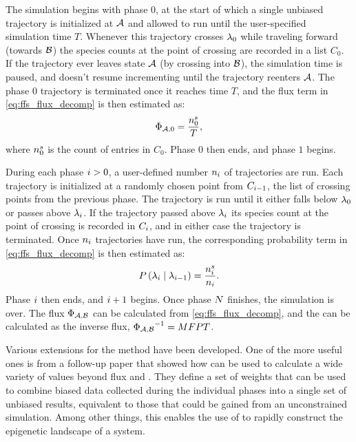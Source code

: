 The simulation begins with phase $0$, at the start of which a single unbiased trajectory is initialized at $\mathcal{A}$ and allowed to run until the user-specified simulation time $T$. Whenever this trajectory crosses ${\lambda}_{0}$ while traveling forward (\ie towards $\mathcal{B}$) the species counts at the point of crossing are recorded in a list $C_0$. If the trajectory ever leaves state $\mathcal{A}$ (\eg by crossing into $\mathcal{B}$), the simulation time is paused, and doesn't resume incrementing until the trajectory reenters $\mathcal{A}$. The phase $0$ trajectory is terminated once it reaches time $T$, and the flux term in \eqref{eq:ffs_flux_decomp} is then estimated as:
\begin{equation*}
    \Phi_{\mathcal{A}, 0} = \frac{n_{0}^{s}}{T},
\end{equation*}
where $n_{0}^{s}$ is the count of entries in $C_0$. Phase $0$ then ends, and phase $1$ begins.

During each phase $i>0$, a user-defined number $n_{i}$ of trajectories are run. Each trajectory is initialized at a randomly chosen point from $C_{i-1}$, the list of crossing points from the previous phase. The trajectory is run until it either falls below ${\lambda}_{0}$ or passes above ${\lambda}_{i}$. If the trajectory passed above ${\lambda}_{i}$ its species count at the point of crossing is recorded in $C_{i}$, and in either case the trajectory is terminated. Once $n_{i}$ trajectories have run, the corresponding probability term in \eqref{eq:ffs_flux_decomp} is then estimated as:
\begin{equation*}
    P\left(  {\lambda}_{i} \mid {\lambda}_{i - 1}  \right) = \frac{n_{i}^{s}}{n_{i}}.
\end{equation*}
Phase $i$ then ends, and $i+1$ begins. Once phase $N$ finishes, the  simulation is over. The flux $\Phi_{\mathcal{A}, \mathcal{B}}$ can be calculated from \eqref{eq:ffs_flux_decomp}, and the  can be calculated as the inverse flux, ${\Phi_{\mathcal{A}, \mathcal{B}}}^{-1} = MFPT$.

Various extensions for the  method have been developed. One of the more useful ones is from a follow-up paper\cite{Valeriani:2007hv} that showed how  can be used to calculate a wide variety of values beyond flux and . They define a set of weights that can be used to combine biased data collected during the individual phases into a single set of unbiased results, equivalent to those that could be gained from an unconstrained  simulation. Among other things, this enables the use of  to rapidly construct the epigenetic landscape of a system.

